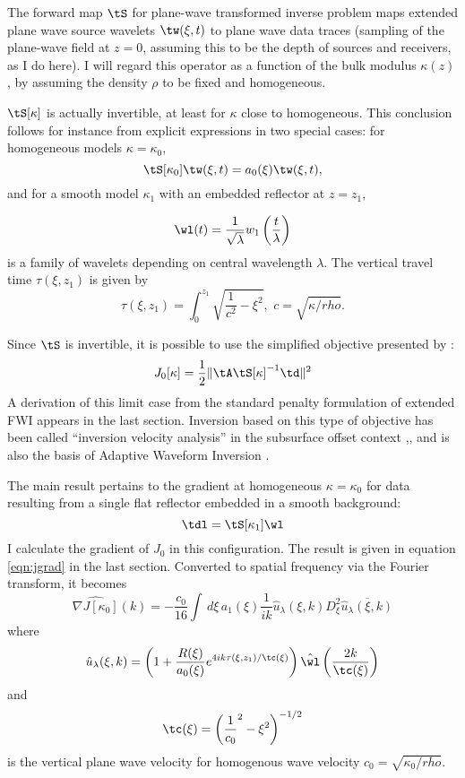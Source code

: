 The forward map $\tS$ for plane-wave transformed inverse problem maps
extended plane wave source wavelets $\tw(\xi,t)$ to plane wave data
traces (sampling of the plane-wave field at $z=0$, assuming this to be the
depth of sources and receivers, as I do here). I will regard this operator as a
function of the bulk modulus $\kappa(z)$, by assuming the density
$\rho$ to be fixed and homogeneous. 

$\tS[\kappa]$ is 
actually invertible, at least for $\kappa$ close to homogeneous. This conclusion follows for instance
from explicit expressions in two special cases: for homogeneous models
$\kappa=\kappa_0$, 
\[
\tS[\kappa_0]\tw(\xi,t) = a_0(\xi)\tw(\xi,t),
\]
and for a smooth model $\kappa_1$ with an embedded reflector at $z=z_1$,

\[
\wl(t)=\frac{1}{\sqrt{\lambda}}w_1\left(\frac{t}{\lambda}\right)
\]
is a family of wavelets depending on central wavelength $\lambda$. The
vertical travel time $\tau(\xi,z_1)$ is given by
\[
\tau(\xi,z_1) = \int_0^{z_1}\sqrt{\frac{1}{c^2}-\xi^2},\,\,c=\sqrt{\kappa/rho}.
\]

Since $\tS$ is invertible, it is possible to use the
simplified objective presented by
\cite{Symes:EAGE15}:
\begin{equation}
\label{eqn:dsobj}
J_0[\kappa]=\frac{1}{2}\|\tA \tS[\kappa]^{-1}\td\|^2
\end{equation}
A derivation of this limit case from the standard penalty formulation
of extended FWI 
appears in the last section. Inversion based on this type of objective
has been called ``inversion velocity analysis'' in the subsurface
offset context \cite[]{Herve2017},\cite[]{HouSymes:Geo18}, and is also the
basis of Adaptive Waveform Inversion
\cite{Warner:14,Warner:16}.

The main result pertains to the gradient at homogeneous
$\kappa=\kappa_0$ for data resulting from a single flat reflector
embedded in a smooth background:
\[
\tdl = \tS[\kappa_1]\wl
\]
I calculate the gradient of $J_0$ in this configuration.
The result is given in equation \ref{eqn:jgrad} in the last
section. Converted to spatial frequency via the Fourier transform, it
becomes
\begin{equation}
\label{eqn:jgradft-intro}
\widehat{\nabla J[\kappa_0]}(k) = -\frac{c_0}{16}\int\, d\xi\,a_1(\xi) 
\frac{1}{ik}\hat{u}_{\lambda}(\xi,k)D_{\xi}^2\overline{\hat{u}_{\lambda}(\xi,k)}
\end{equation}
where
\[
\hat{u}_{\lambda}(\xi,k) = \left(1 +
  \frac{R(\xi)}{a_0(\xi)}e^{4ik\tau(\xi,z_1)/\tc(\xi)}\right)\hat{\wl}\left(\frac{2k}{\tc(\xi)}\right) 
\]
and 
\[
\tc(\xi) = \left(\frac{1}{c_0}^2-\xi^2\right)^{-1/2}
\]
is the vertical plane wave velocity for homogenous wave velocity
$c_0 = \sqrt{\kappa_0/rho}$.

